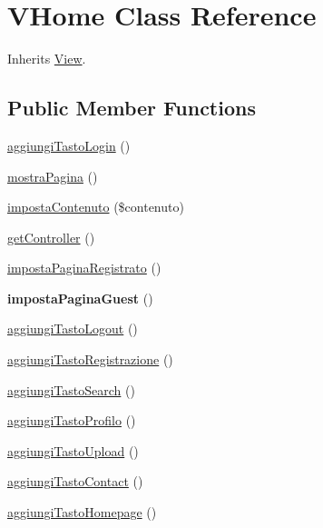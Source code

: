 \hypertarget{class_v_home}{}\section{V\+Home Class Reference}
\label{class_v_home}


Inherits \mbox{\hyperlink{class_view}{View}}.

\subsection*{Public Member Functions}
\begin{DoxyCompactItemize}
\item 
\mbox{\hyperlink{class_v_home_a9f4f529088918cace57553a3db123152}{aggiungi\+Tasto\+Login}} ()
\item 
\mbox{\hyperlink{class_v_home_a46759d4232bd0607baff37daa710b4fb}{mostra\+Pagina}} ()
\item 
\mbox{\hyperlink{class_v_home_adc521709c98ca1fed92db3923c3d5b55}{imposta\+Contenuto}} (\$contenuto)
\item 
\mbox{\hyperlink{class_v_home_aa8b89e0bad51878addc1300cd3e95b5c}{get\+Controller}} ()
\item 
\mbox{\hyperlink{class_v_home_a19d02ab00682bacf312e22ad6494ceec}{imposta\+Pagina\+Registrato}} ()
\item 
\mbox{\label{class_v_home_a77cc3ecaf9ae5edd3da59a6c33a4ef15}} 
{\bfseries imposta\+Pagina\+Guest} ()
\item 
\mbox{\hyperlink{class_v_home_ab0039ca5d1d52ecb682381ccf49e3c9d}{aggiungi\+Tasto\+Logout}} ()
\item 
\mbox{\hyperlink{class_v_home_aa92baf7c9b82fe4d08c7cbc2328a84c1}{aggiungi\+Tasto\+Registrazione}} ()
\item 
\mbox{\hyperlink{class_v_home_a0e650bd9db71247a3bdcc37e1b9cca07}{aggiungi\+Tasto\+Search}} ()
\item 
\mbox{\hyperlink{class_v_home_a5944d155e8ff034c8bd1b1b2c50538eb}{aggiungi\+Tasto\+Profilo}} ()
\item 
\mbox{\hyperlink{class_v_home_ab9f05cc1c0334345d8bf05de0f427a8c}{aggiungi\+Tasto\+Upload}} ()
\item 
\mbox{\hyperlink{class_v_home_ac03aa54c6001e57b53284e6ddc21ffcf}{aggiungi\+Tasto\+Contact}} ()
\item 
\mbox{\hyperlink{class_v_home_a72f16e9d9862a548b2669c6f1f28c7e7}{aggiungi\+Tasto\+Homepage}} ()
\end{DoxyCompactItemize}
